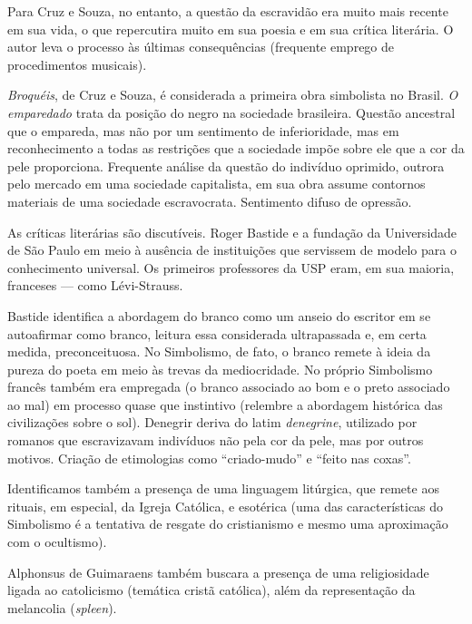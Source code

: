 Para Cruz e Souza, no entanto, a questão da escravidão era muito mais recente em sua vida, o que repercutira muito em sua poesia e em sua crítica literária. O autor leva o processo às últimas consequências (frequente emprego de procedimentos musicais).

\textit{Broquéis}, de Cruz e Souza, é considerada a primeira obra simbolista no Brasil. \textit{O emparedado} trata da posição do negro na sociedade brasileira. Questão ancestral que o empareda, mas não por um sentimento de inferioridade, mas em reconhecimento a todas as restrições que a sociedade impõe sobre ele que a cor da pele proporciona. Frequente análise da questão do indivíduo oprimido, outrora pelo mercado em uma sociedade capitalista, em sua obra assume contornos materiais de uma sociedade escravocrata. Sentimento difuso de opressão.

As críticas literárias são discutíveis. Roger Bastide e a fundação da Universidade de São Paulo em meio à ausência de instituições que servissem de modelo para o conhecimento universal. Os primeiros professores da USP eram, em sua maioria, franceses — como Lévi-Strauss.

Bastide identifica a abordagem do branco como um anseio do escritor em se autoafirmar como branco, leitura essa considerada ultrapassada e, em certa medida, preconceituosa. No Simbolismo, de fato, o branco remete à ideia da pureza do poeta em meio às trevas da mediocridade. No próprio Simbolismo francês também era empregada (o branco associado ao bom e o preto associado ao mal) em processo quase que instintivo (relembre a abordagem histórica das civilizações sobre o sol). Denegrir deriva do latim \textit{denegrine}, utilizado por romanos que escravizavam indivíduos não pela cor da pele, mas por outros motivos. Criação de etimologias como ``criado-mudo'' e ``feito nas coxas''.

Identificamos também a presença de uma linguagem litúrgica, que remete aos rituais, em especial, da Igreja Católica, e esotérica (uma das características do Simbolismo é a tentativa de resgate do cristianismo e mesmo uma aproximação com o ocultismo).

Alphonsus de Guimaraens também buscara a presença de uma religiosidade ligada ao catolicismo (temática cristã católica), além da representação da melancolia (\textit{spleen}).

